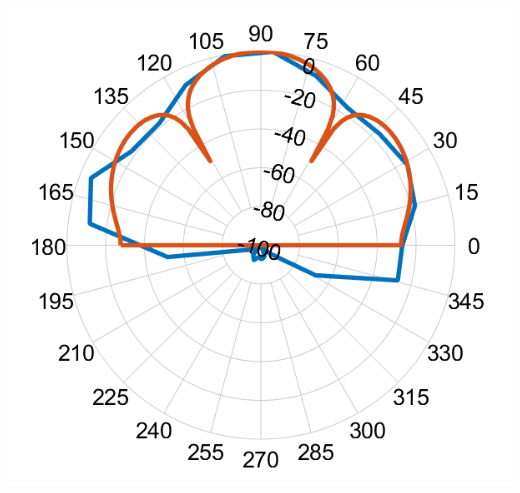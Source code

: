 \documentclass[landscape,a1paper,fontscale=0.5]{baposter} %
\begin{document}
\begin{poster}
{\begin{multicols}{2}
	\begin{center}
		\includegraphics[width=0.6\linewidth]{deg90hardware.png}
	\end{center}

	
\end{multicols}
}



\end{poster}
\end{document}
